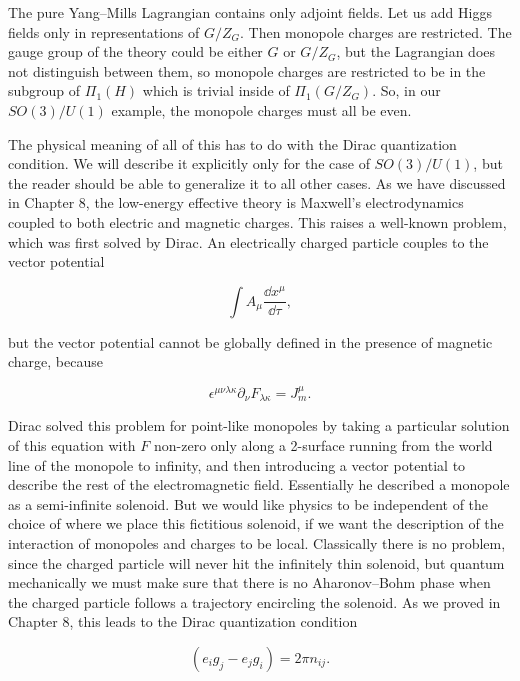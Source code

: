 The pure Yang--Mills Lagrangian contains only adjoint fields. Let us add Higgs
fields only in representations of $G/Z_G$. Then monopole charges are restricted.
The gauge group of the theory could be either $G$ or $G/Z_G$, but the Lagrangian
does not distinguish between them, so monopole charges are restricted to be in
the subgroup of $\Pi_1(H)$ which is trivial inside of $\Pi_1(G/Z_G)$. So, in our
$SO(3)/U(1)$ example, the monopole charges must all be even.

The physical meaning of all of this has to do with the Dirac quantization
condition. We will describe it explicitly only for the case of $SO(3)/U(1)$,
but the reader should be able to generalize it to all other cases. As we have
discussed in Chapter 8, the low-energy effective theory is Maxwell's
electrodynamics coupled to both electric and magnetic charges. This raises a
well-known problem, which was first solved by Dirac. An electrically charged
particle couples to the vector potential

\[
  \int A_\mu\frac{\dd x^\mu}{\dd\tau},
\]

but the vector potential cannot be globally defined in the presence of magnetic
charge, because

\[
  \epsilon^{\mu\nu\lambda\kappa}\partial_\nu F_{\lambda\kappa}
  =J_m^\mu.
\]

Dirac solved this problem for point-like monopoles by taking a particular
solution of this equation with $F$ non-zero only along a 2-surface running from
the world line of the monopole to infinity, and then introducing a vector
potential to describe the rest of the electromagnetic field. Essentially he
described a monopole as a semi-infinite solenoid. But we would like physics to be
independent of the choice of where we place this fictitious solenoid, if we want
the description of the interaction of monopoles and charges to be local.
Classically there is no problem, since the charged particle will never hit the
infinitely thin solenoid, but quantum mechanically we must make sure that there
is no Aharonov--Bohm phase when the charged particle follows a trajectory
encircling the solenoid. As we proved in Chapter 8, this leads to the Dirac
quantization condition

\begin{equation}
  (e_i g_j-e_jg_i)=2\pi n_{ij}.
  \label{eq:10.23}
\end{equation}

